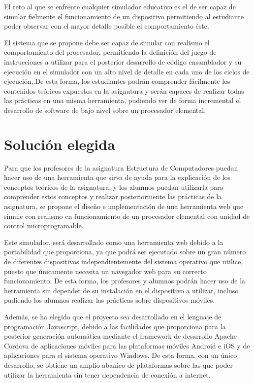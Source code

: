 El reto al que se enfrente cualquier simulador educativo es el de ser capaz de simular fielmente el funcionamiento de un dispositivo permitiendo al estudiante poder observar con el mayor detalle posible el comportamiento éste.

El sistema que se propone debe ser capaz de simular con realismo el comportamiento del procesador, permitiendo la definición del juego de instrucciones a utilizar para el posterior desarrollo de código ensamblador y su ejecución en el simulador con un alto nivel de detalle en cada uno de los ciclos de ejecución,.De esta forma, los estudiantes podrán comprender fácilmente los contenidos teóricos expuestos en la asignatura y serán capaces de realizar todas las prácticas en una misma herramienta, pudiendo ver de forma incremental el desarrollo de software de bajo nivel sobre un procesador elemental.


\section{Solución elegida}
\label{sec:solution_selection}

Para que los profesores de la asignatura Estructura de Computadores puedan hacer uso de una herramienta que sirva de ayuda para la explicación de los conceptos teóricos de la asignatura, y los alumnos puedan utilizarla para comprender estos conceptos y realizar posteriormente las prácticas de la asignatura, se propone el diseño e implementación de una herramienta web que simule con realismo en funcionamiento de un procesador elemental con unidad de control microprogramable.

Este simulador, será desarrollado como una herramienta web debido a la portabilidad que proporciona, ya que podrá ser ejecutado sobre un gran número de diferentes dispositivos independientemente del sistema operativo que utilice, puesto que únicamente necesita un navegador web para su correcto funcionamiento. De esta forma, los profesores y alumnos podrán hacer uso de la herramienta sin depender de su instalación en el dispositivo a utilizar, incluso pudiendo los alumnos realizar las prácticas sobre dispositivos móviles.

Además, se ha elegido que el proyecto sea desarrollado en el lenguaje de programación Javascript, debido a las facilidades que proporciona para la posterior generación automática mediante el framework de desarrollo Apache Cordova de aplicaciones móviles para las plataformas móviles Android e iOS y de aplicaciones para el sistema operativo Windows. De esta forma, con un único desarrollo, se obtiene un amplio abanico de plataformas sobre las que poder utilizar la herramienta sin tener dependencia de conexión a internet.

